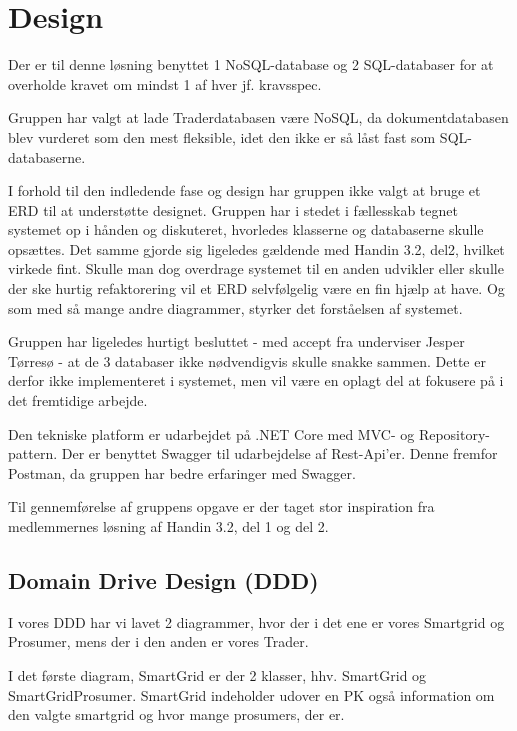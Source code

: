 
\section{Design}

Der er til denne løsning benyttet 1 NoSQL-database og 2 SQL-databaser for at overholde kravet om mindst 1 af hver jf. kravsspec.

Gruppen har valgt at lade Traderdatabasen være NoSQL, da dokumentdatabasen blev vurderet som den mest fleksible, idet den ikke er så låst fast som SQL-databaserne.

I forhold til den indledende fase og design har gruppen ikke valgt at bruge et ERD til at understøtte designet. Gruppen har i stedet i fællesskab tegnet systemet op i hånden og diskuteret, hvorledes klasserne og databaserne skulle opsættes. Det samme gjorde sig ligeledes gældende med Handin 3.2, del2, hvilket virkede fint.
Skulle man dog overdrage systemet til en anden udvikler eller skulle der ske hurtig refaktorering vil et ERD selvfølgelig være en fin hjælp at have. Og som med så mange andre diagrammer, styrker det forståelsen af systemet.

Gruppen har ligeledes hurtigt besluttet - med accept fra underviser Jesper Tørresø - at de 3 databaser ikke nødvendigvis skulle snakke sammen.
Dette er derfor ikke implementeret i systemet, men vil være en oplagt del at fokusere på i det fremtidige arbejde.

Den tekniske platform er udarbejdet på .NET Core med MVC- og Repository-pattern.
Der er benyttet Swagger til udarbejdelse af Rest-Api'er. Denne fremfor Postman, da gruppen har bedre erfaringer med Swagger.

Til gennemførelse af gruppens opgave er der taget stor inspiration fra medlemmernes løsning af Handin 3.2, del 1 og del 2.

\subsection{Domain Drive Design (DDD)}

I vores DDD har vi lavet 2 diagrammer, hvor der i det ene er vores Smartgrid og Prosumer, mens der i  den anden er vores Trader.

I det første diagram, SmartGrid er der 2 klasser, hhv. SmartGrid og SmartGridProsumer. SmartGrid indeholder udover en PK også information om den valgte smartgrid og hvor mange prosumers, der er.

